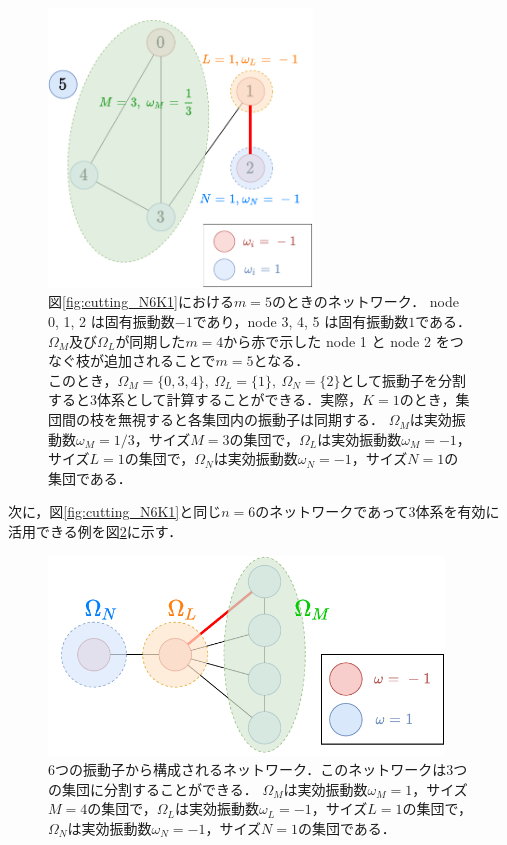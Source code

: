 \documentclass[../main]{subfiles}
\begin{document}
\begin{figure}[tbp]
\centering
\includegraphics[width=70mm]{images/cutting_N6_drawio.pdf}
\centering
\caption{図\ref{fig:cutting_N6K1}における$m=5$のときのネットワーク．
node 0, 1, 2 は固有振動数$-1$であり，node 3, 4, 5 は固有振動数$1$である．$\Omega_M$及び$\Omega_L$が同期した$m=4$から赤で示した node 1 と node 2 をつなぐ枝が追加されることで$m=5$となる．\\
このとき，$\Omega_M=\{0,3,4\},\ \Omega_L=\{1\},\ \Omega_N=\{2\}$として振動子を分割すると3体系として計算することができる．実際，$K=1$のとき，集団間の枝を無視すると各集団内の振動子は同期する．
$\Omega_M$は実効振動数$\omega_M=1/3$，サイズ$M=3$の集団で，$\Omega_L$は実効振動数$\omega_M=-1$，サイズ$L=1$の集団で，$\Omega_N$は実効振動数$\omega_N=-1$，サイズ$N=1$の集団である．}
\label{fig:cutting_N6-m5}
\end{figure}

次に，図\ref{fig:cutting_N6K1}と同じ$n=6$のネットワークであって3体系を有効に活用できる例を図\ref{fig:3body-application}に示す．

\begin{figure}[tbp]
    \centering
    \includegraphics[width=105mm]{images/three-body-application.pdf}
    \centering
    \caption{6つの振動子から構成されるネットワーク．このネットワークは3つの集団に分割することができる．
    $\Omega_M$は実効振動数$\omega_M=1$，サイズ$M=4$の集団で，$\Omega_L$は実効振動数$\omega_L=-1$，サイズ$L=1$の集団で，$\Omega_N$は実効振動数$\omega_N=-1$，サイズ$N=1$の集団である．}
    \label{fig:3body-application}
\end{figure}
\end{document}
